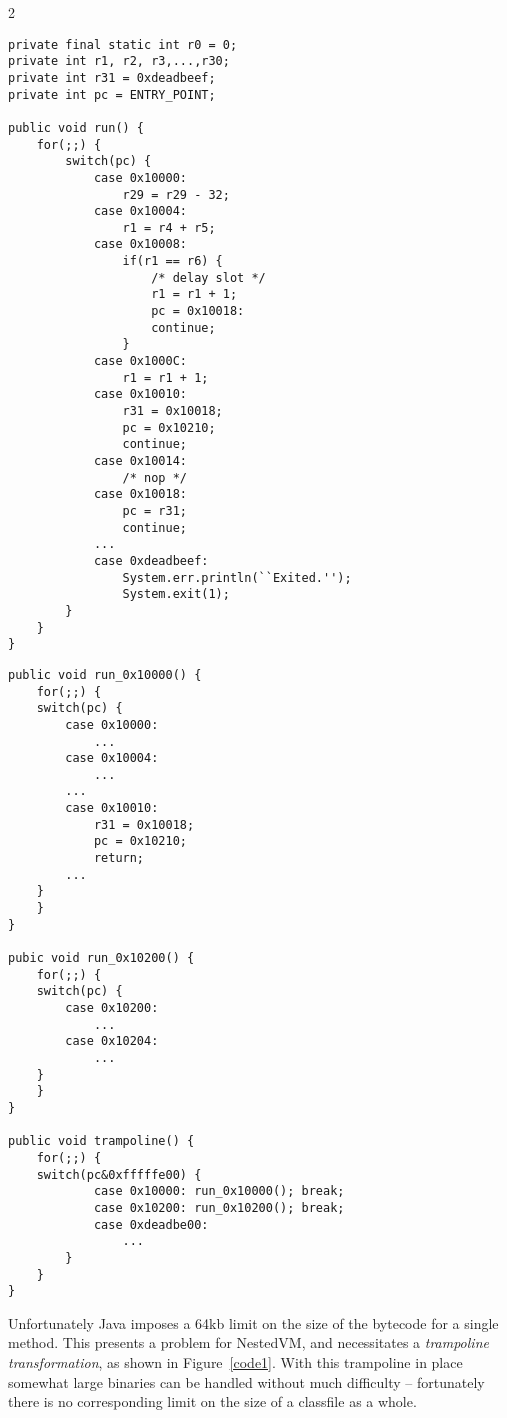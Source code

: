 \documentclass{acmconf}
\begin{document}
\begin{figure*}[t]
\begin{minipage}[c]{7in}%
\begin{multicols}{2}
{\footnotesize\begin{verbatim}
private final static int r0 = 0;
private int r1, r2, r3,...,r30;
private int r31 = 0xdeadbeef;
private int pc = ENTRY_POINT;

public void run() {
    for(;;) {
        switch(pc) {
            case 0x10000:
                r29 = r29 - 32;
            case 0x10004:
                r1 = r4 + r5;
            case 0x10008:
                if(r1 == r6) {
                    /* delay slot */
                    r1 = r1 + 1;
                    pc = 0x10018:
                    continue;
                }
            case 0x1000C:
                r1 = r1 + 1;
            case 0x10010:
                r31 = 0x10018;
                pc = 0x10210;
                continue;
            case 0x10014:
                /* nop */
            case 0x10018:
                pc = r31;
                continue;
            ...
            case 0xdeadbeef:
                System.err.println(``Exited.'');
                System.exit(1);
        }
    }
}
\end{verbatim}}
\vspace{1in}
{\footnotesize\begin{verbatim}
public void run_0x10000() {
    for(;;) {
    switch(pc) {
        case 0x10000:
            ...
        case 0x10004:
            ...
        ...
        case 0x10010:
            r31 = 0x10018;
            pc = 0x10210;
            return;
        ...
    }
    }
}

pubic void run_0x10200() {
    for(;;) {
    switch(pc) {
        case 0x10200:
            ...
        case 0x10204:
            ...
    }
    }
}

public void trampoline() {
    for(;;) {
    switch(pc&0xfffffe00) {
            case 0x10000: run_0x10000(); break;
            case 0x10200: run_0x10200(); break;
            case 0xdeadbe00:
                ...
        }
    }
}
\end{verbatim}}
\end{multicols}
\end{minipage}
\caption{\label{code1} Trampoline transformation necessitated by Java's 64kb method size limit}
\end{figure*}

Unfortunately Java imposes a 64kb limit on the size of the bytecode
for a single method.  This presents a problem for NestedVM, and
necessitates a {\it trampoline transformation}, as shown in
Figure~\ref{code1}.  With this trampoline in place somewhat large
binaries can be handled without much difficulty -- fortunately there
is no corresponding limit on the size of a classfile as a whole.
\end{document}
